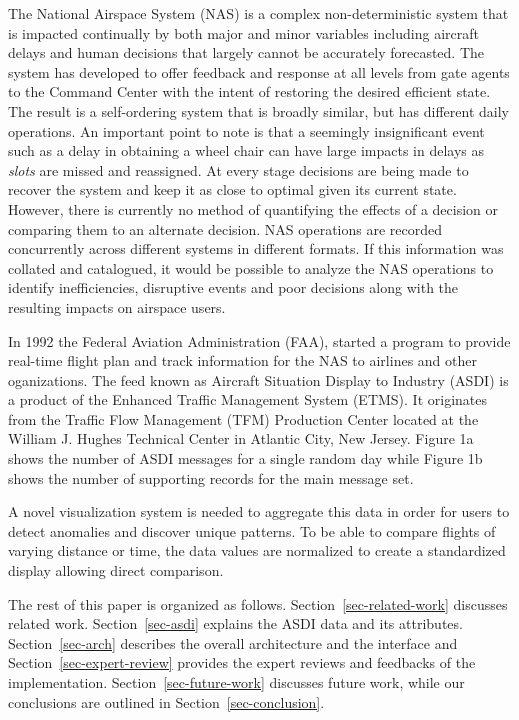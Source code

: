 \documentclass{sig-alternate}
\begin{document}
The National Airspace System (NAS) is a complex non-deterministic system that
is impacted continually by both major and minor variables including aircraft
delays and human decisions that largely cannot be accurately forecasted.
The system has developed to offer feedback and response at all levels from
gate agents to the Command Center with the intent of restoring the desired
efficient state. The result is a self-ordering system that is broadly
similar, but has different daily operations. An important point to note is that
a seemingly insignificant event such as
a delay in obtaining a wheel chair can have large impacts in delays
as \emph{slots} are missed and reassigned. At every stage decisions are being
made to recover the system and keep it as close to optimal given its current
state. However, there is currently no method of quantifying the effects of 
a decision or comparing them to an alternate decision. NAS operations
are recorded concurrently across different systems in different formats.
If this information was collated and catalogued, it would be possible
to analyze the NAS operations to identify inefficiencies, disruptive events 
and poor decisions along with the resulting impacts on airspace users.

In 1992 the Federal Aviation Administration (FAA), started a program to provide
real-time flight plan and track information for the NAS to airlines and other
oganizations. The feed known as Aircraft Situation Display to Industry (ASDI) is a 
product of the Enhanced Traffic Management System (ETMS). It originates from
the Traffic Flow Management (TFM) Production Center located at the William
J. Hughes Technical Center in Atlantic City, New Jersey. Figure 1a shows the 
number of ASDI messages for a single random day while Figure 1b shows the number
of supporting records for the main message set.

A novel visualization system is needed to aggregate this data in order for 
users to detect anomalies and discover unique patterns. To be able to compare 
flights of varying distance or time, the data values are normalized to 
create a standardized display allowing direct comparison.

The rest of this paper is organized as follows. Section~\ref{sec-related-work}
discusses related
work. Section~\ref{sec-asdi} explains the ASDI data and its attributes. 
Section~\ref{sec-arch} describes
the overall architecture and the interface and Section~\ref{sec-expert-review}
provides the expert reviews
and feedbacks of the implementation. Section~\ref{sec-future-work}
discusses future work, while our conclusions
are outlined in Section~\ref{sec-conclusion}.
\end{document}
